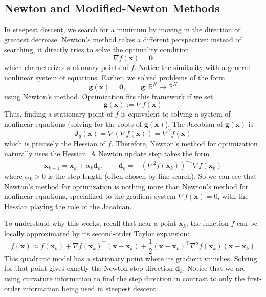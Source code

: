 \subsection{Newton and Modified-Newton Methods}
\label{sec:newton}
In steepest descent, we search for a minimum by moving in the direction of greatest decrease. Newton's method takes a different perspective: instead of searching, it directly tries to solve the optimality condition
\begin{equation}
\nabla f(\mathbf{x}) = \mathbf{0}
\end{equation}
which characterizes stationary points of $f$. Notice the similarity with a general nonlinear system of equations. Earlier, we solved problems of the form
\begin{equation}
\mathbf{g}(\mathbf{x}) = \mathbf{0}, \qquad \mathbf{g}:\mathbb{R}^N \to \mathbb{R}^N
\end{equation}
using Newton's method. Optimization fits this framework if we set
\begin{equation}
\mathbf{g}(\mathbf{x}) := \nabla f(\mathbf{x})
\end{equation}
Thus, finding a stationary point of $f$ is equivalent to solving a system of nonlinear equations (solving for the roots of $\mathbf{g}(\mathbf{x})$). The Jacobian of $\mathbf{g}(\mathbf{x})$ is
\begin{equation}
\mathbf{J}_g(\mathbf{x}) = \nabla(\nabla f(\mathbf{x})) = \nabla^2 f(\mathbf{x})
\end{equation}
which is precisely the Hessian of $f$. Therefore, Newton's method for optimization naturally uses the Hessian. A Newton update step takes the form
\begin{equation}
\mathbf{x}_{k+1} = \mathbf{x}_k + \alpha_k \mathbf{d}_k,
\qquad
\mathbf{d}_k = -\left(\nabla^2 f(\mathbf{x}_k)\right)^{-1}\nabla f(\mathbf{x}_k)
\label{eq:newton_direction}
\end{equation}
where $\alpha_k > 0$ is the step length (often chosen by line search). So we can see that Newton's method for optimization is nothing more than Newton's method for nonlinear equations, specialized to the gradient system $\nabla f(\mathbf{x})=0$, with the Hessian playing the role of the Jacobian.

To understand why this works, recall that near a point $\mathbf{x}_k$, the function $f$ can be locally approximated by its second-order Taylor expansion:
\begin{equation}
f(\mathbf{x}) \approx f(\mathbf{x}_k) 
+ \nabla f(\mathbf{x}_k)^\top(\mathbf{x}-\mathbf{x}_k) 
+ \frac{1}{2}(\mathbf{x}-\mathbf{x}_k)^\top \nabla^2 f(\mathbf{x}_k)(\mathbf{x}-\mathbf{x}_k)
\end{equation}
This quadratic model has a stationary point where its gradient vanishes. Solving for that point gives exactly the Newton step direction $\mathbf{d}_k$. Notice that we are using curvature information to find the step direction in contrast to only the first-order information being used in steepest descent.

